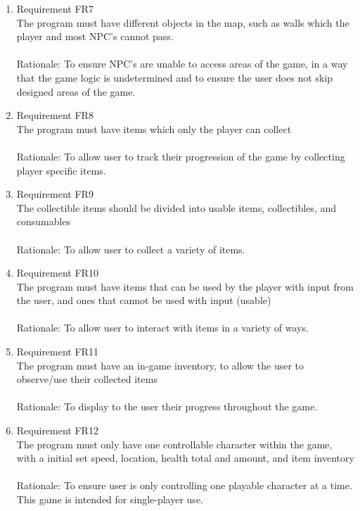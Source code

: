 \documentclass[12pt, titlepage]{article}
\begin{document}
\begin{enumerate}
    \item Requirement FR7\\The program must have different objects in the map, such as walls which the player and most NPC's cannot pass.\\\\
    {\color{blue}Rationale: To ensure NPC's are unable to access areas of the game, in a way that the game logic is undetermined and to ensure the user does not skip designed areas of the game.}
    
    \item Requirement FR8\\ The program must have items which only the player can collect\\\\
    {\color{blue}Rationale: To allow user to track their progression of the game by collecting player specific items.}
    
    \item Requirement FR9\\ The collectible items should be divided into usable items, collectibles, and consumables\\\\
    {\color{blue}Rationale: To allow user to collect a variety of items.}
    
    \item Requirement FR10\\The program must have items that can be used by the player with input from the user, and ones that cannot be used with input (usable)\\\\
    {\color{blue}Rationale: To allow user to interact with items in a variety of ways.}
    
    \item Requirement FR11\\The program must have an in-game inventory, to allow the user to observe/use their collected items\\\\
    {\color{blue}Rationale: To display to the user their progress throughout the game.}
    
    \item Requirement FR12\\The program must only have one controllable character within the game, with a initial set speed, location, health total and amount, and item inventory\\\\
    {\color{blue}Rationale: To ensure user is only controlling one playable character at a time. This game is intended for single-player use.}
    

\end{enumerate}
\end{document}
